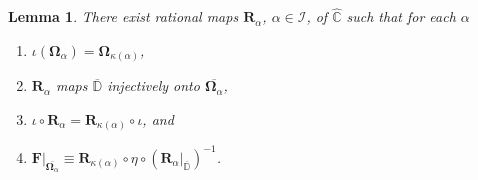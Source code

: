 \documentclass[JEP,XML,SOM,Unicode,NoFloatCountersInSection,published]{cedram}
\newtheorem{lemma}{Lemma}[section]
\theoremstyle{definition}
\theoremstyle{remark}
\newcommand{\C}{\mathbb{C}}
\newcommand{\D}{\mathbb{D}}
\begin{document}
\begin{lemma}\label{real_sym_schwarz_lem}
There exist rational maps $\pmb{R}_\alpha$, $\alpha\in\mathcal{I}$, of $\widehat{\C}$ such that for each $\alpha$
\begin{enumerate}
\item $\iota(\pmb{\Omega}_\alpha)=\pmb{\Omega}_{\kappa(\alpha)}$,

\item $\pmb{R}_\alpha$ maps $\overline{\D}$ injectively onto $\overline{\pmb{\Omega}_\alpha}$,

\item $\iota\circ\pmb{R}_\alpha=\pmb{R}_{\kappa(\alpha)}\circ\iota$, and

\item $\pmb{F}\vert_{\overline{\pmb{\Omega}_\alpha}}\equiv \pmb{R}_{\kappa(\alpha)}\circ\eta\circ(\pmb{R}_\alpha\vert_{\overline{\D}})^{-1}$.
\end{enumerate}
\end{lemma}
\end{document}
